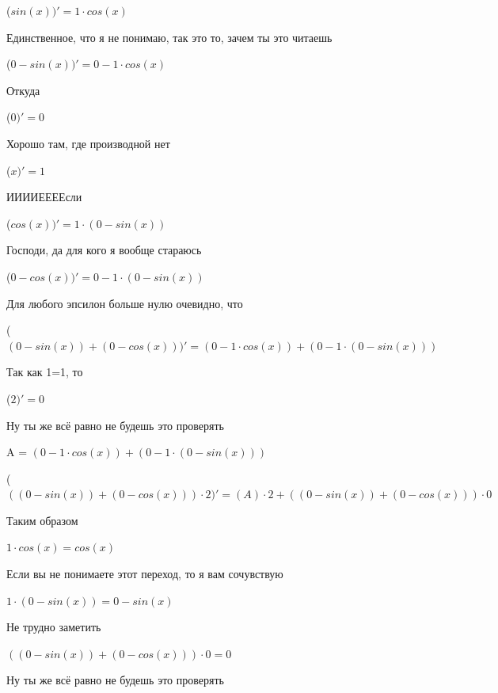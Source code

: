 \documentclass[12pt,a4paper,fleqn]{article}
\begin{document}
\begin{center}
\begin{center}
\begin{center}
\begin{center}
\begin{center}
\begin{center}
\begin{center}
\begin{center}
\begin{center}
\begin{center}
\begin{center}
\begin{center}
\begin{center}
\begin{center}
\begin{center}
\begin{center}
\begin{center}
\begin{center}
 ($sin(x))'
  = 1 \cdot cos(x)$\end{center}
Единственное, что я не понимаю, так это то, зачем ты это читаешь

\begin{center}
 ($0-sin(x))'
  = 0-1 \cdot cos(x)$\end{center}
Откуда

\begin{center}
 ($0)'
  = 0$\end{center}
Хорошо там, где производной нет\cite{link2}

\begin{center}
 ($x)'
  = 1$\end{center}
ИИИИЕЕЕЕсли\cite{link3}

\begin{center}
 ($cos(x))'
  = 1 \cdot (0-sin(x))$\end{center}
Господи, да для кого я вообще стараюсь

\begin{center}
 ($0-cos(x))'
  = 0-1 \cdot (0-sin(x))$\end{center}
Для любого эпсилон больше нулю очевидно, что

\begin{center}
 ($(0-sin(x))+(0-cos(x)))'
  = (0-1 \cdot cos(x))+(0-1 \cdot (0-sin(x)))$\end{center}
Так как 1=1, то\cite{link4}

\begin{center}
 ($2)'
  = 0$\end{center}
Ну ты же всё равно не будешь это проверять

\begin{center}
A = $(0-1 \cdot cos(x))+(0-1 \cdot (0-sin(x)))$\end{center}
\begin{center}
 ($((0-sin(x))+(0-cos(x))) \cdot 2)'
  = (A) \cdot 2+((0-sin(x))+(0-cos(x))) \cdot 0$\end{center}
Таким образом

\begin{center}
$1 \cdot cos(x) = cos(x)$\end{center}
Если вы не понимаете этот переход, то я вам сочувствую

\begin{center}
$1 \cdot (0-sin(x)) = 0-sin(x)$\end{center}
Не трудно заметить

\begin{center}
$((0-sin(x))+(0-cos(x))) \cdot 0 = 0$\end{center}
Ну ты же всё равно не будешь это проверять


\end{center}
\end{center}
\end{center}
\end{center}
\end{center}
\end{center}
\end{center}
\end{center}
\end{center}
\end{center}
\end{center}
\end{center}
\end{center}
\end{center}
\end{center}
\end{center}
\end{center}
\end{document}
